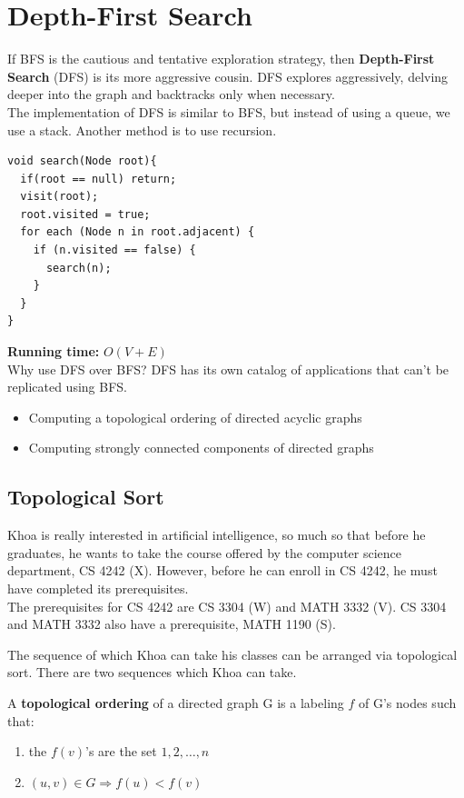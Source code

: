 \documentclass[]{book}
\newcommand{\runtime}[1]{\textbf{Running time:} $O(#1)$\\}
\begin{document}
    \section{Depth-First Search}
    If BFS is the cautious and tentative exploration strategy, then \textbf{Depth-First Search}
    (DFS) is its more aggressive cousin. DFS explores aggressively, delving deeper
    into the graph and backtracks only when necessary.\\
    \indent The implementation of DFS is similar to BFS, but instead of using a queue, we
    use a stack. Another method is to use recursion.\\
    \begin{Verbatim}
void search(Node root){
  if(root == null) return;
  visit(root);
  root.visited = true;
  for each (Node n in root.adjacent) {
    if (n.visited == false) {
      search(n);
    }
  }
}
    \end{Verbatim}
    \runtime{V + E}
    Why use DFS over BFS? DFS has its own catalog of applications that can't be replicated
    using BFS.
    \begin{itemize}
      \item Computing a topological ordering of directed acyclic graphs
      \item Computing strongly connected components of directed graphs
    \end{itemize}

      \subsection{Topological Sort}
      Khoa is really interested in artificial intelligence, so much so that before he graduates,
      he wants to take the course offered by the computer science department, CS 4242 (X).
      However, before he can enroll in CS 4242, he must have completed its prerequisites.\\
      \indent The prerequisites for CS 4242 are CS 3304 (W) and MATH 3332 (V). CS 3304 and MATH 3332
      also have a prerequisite, MATH 1190 (S).

      The sequence of which Khoa can take his classes can be arranged via topological sort.
      There are two sequences which Khoa can take.

      A \textbf{topological ordering} of a directed graph G
      is a labeling $f$ of G's nodes such that:
      \begin{enumerate}
        \item the $f(v)$'s are the set ${1,2,\ldots, n}$
        \item $(u,v) \in G \Rightarrow f(u) < f(v)$
      \end{enumerate}
\end{document}
